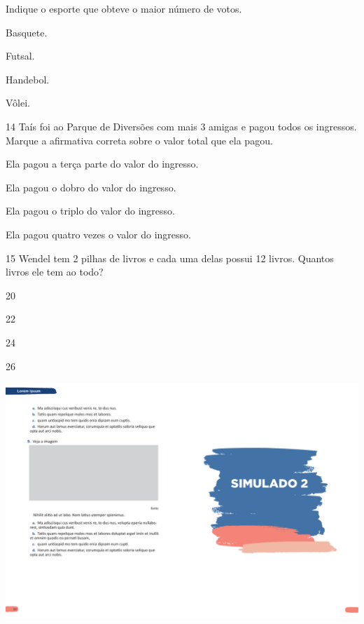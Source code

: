 \pagebreak

Indique o esporte que obteve o maior número de votos.

\begin{escolha}
\item Basquete.

\item Futsal.

\item Handebol.

\item Vôlei.
\end{escolha}

\num{14} Taís foi ao Parque de Diversões com mais 3 amigas e pagou todos os ingressos. Marque a afirmativa correta sobre o valor total que ela pagou.

\begin{escolha}
\item Ela pagou a terça parte do valor do ingresso.

\item Ela pagou o dobro do valor do ingresso.

\item Ela pagou o triplo do valor do ingresso.

\item Ela pagou quatro vezes o valor do ingresso.
\end{escolha}


\num{15} Wendel tem 2 pilhas de livros e cada uma delas possui 12 livros. Quantos livros ele tem ao todo?


\begin{escolha}
\item 20

\item 22

\item 24

\item 26
\end{escolha}

\blankpage
\vspace*{-3.4cm}
\hspace*{-3.7cm}\includegraphics[scale=1]{../watermarks/2simulado5ano.pdf}

